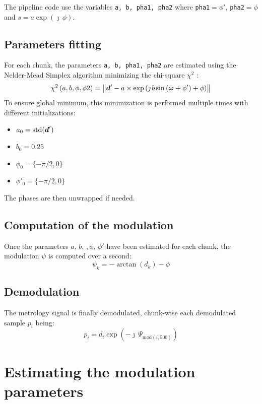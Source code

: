 \documentclass[a4paper,11pt,twoside]{scrartcl}
\begin{document}
The pipeline code use the variables \verb+a, b, pha1, pha2+ where \verb|pha1|$=\phi'$, \verb|pha2|$=\phi$ and $s = a \exp(\jmath\,\phi)$.


\subsection{Parameters fitting}
For each chunk, the parameters \verb+a, b, pha1, pha2+ are estimated using the Nelder-Mead Simplex algorithm minimizing the chi-square $\chi^2$ :
\begin{equation}
    \chi^2 \left( a, b, \phi, \phi2 \right) =   \left\Vert \boldsymbol{d}' -  a \times  \exp\left( \jmath \, b \sin\left( \boldsymbol{\omega} + \phi' \right) + \phi \right)\right\Vert
\end{equation}
To ensure global minimum, this minimization is performed multiple times with different initializations:
\begin{itemize}
    \item $a_0 = \mathrm{std}(\boldsymbol{d}')$
    \item $b_0 = 0.25$
    \item $\phi_0 = \{-\pi/2, 0\} $
    \item $\phi'_0 = \{-\pi/2, 0\} $
\end{itemize}
The phases are then unwrapped if needed.

\subsection{Computation of the modulation}
Once the parameters $a,\,b,\,,\phi,\,\phi'$ have been estimated for each chunk, the modulation $\psi$ is computed over a second:
\begin{equation}
   \psi_k =  -\arctan(d_k) - \phi
\end{equation}

\subsection{Demodulation}
The metrology signal is finally demodulated, chunk-wise each demodulated sample $p_i$  being:
\begin{equation}
   p_i = d_i  \exp\left(- \jmath \,\Psi_{\textrm{mod}(i,500)} \right) 
\end{equation}


\section{ Estimating the modulation parameters}
\end{document}

